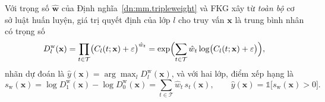 \begin{dn}\label{dn:mm.fisagmw}
Với trọng số $\hat{\mathbf w}$ của Định nghĩa~\ref{dn:mm.tripleweight} và FKG xây từ \emph{toàn bộ} cơ sở luật
huấn luyện, giá trị quyết định của lớp $l$ cho truy vấn $\mathbf{x}$ là trung bình nhân có trọng số
\begin{equation}\label{eq:mm.fisagmw}
  D^{\mathrm w}_l(\mathbf{x}) = \prod_{t\in\mathcal{T}} \bigl(C_l(t;\mathbf{x})+\varepsilon\bigr)^{\hat w_t}
  = \exp\Bigl(\sum_{t\in\mathcal{T}} \hat w_t \log\bigl(C_l(t;\mathbf{x})+\varepsilon\bigr)\Bigr),
\end{equation}
nhãn dự đoán là $\hat y(\mathbf{x})=\arg\max_l D^{\mathrm w}_l(\mathbf{x})$, và với hai lớp, điểm xếp hạng là
\begin{equation}\label{eq:mm.fisagmw.score}
  s_{\mathrm w}(\mathbf{x}) = \log D^{\mathrm w}_1(\mathbf{x}) - \log D^{\mathrm w}_0(\mathbf{x})
  = \sum_{t\in\mathcal{T}} \hat w_t\, s_t(\mathbf{x}),
  \qquad \hat y(\mathbf{x}) = \mathbb{1}\bigl[s_{\mathrm w}(\mathbf{x})>0\bigr].
\end{equation}
\end{dn}

